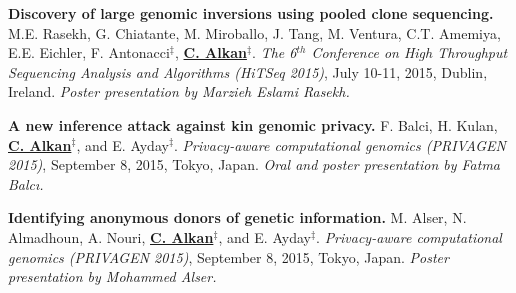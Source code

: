 \vspace{-.2cm}
{\bf Discovery of large genomic inversions using pooled clone sequencing.}
M.E. Rasekh, G. Chiatante, M. Miroballo, J. Tang, M. Ventura, C.T. Amemiya, E.E. Eichler, F. Antonacci$^\ddag$, {\bf {\underline{C. Alkan}}}$^\ddag$.
{\em The 6$^{th}$ Conference on High Throughput Sequencing Analysis and Algorithms (HiTSeq 2015)}, 
July 10-11, 2015, Dublin, Ireland. {\it Poster presentation by Marzieh Eslami Rasekh.}

\vspace{-.2cm}
{\bf  A new inference attack against kin genomic privacy.}
F. Balci, H. Kulan, {\bf {\underline{C. Alkan}}}$^\ddag$, and E. Ayday$^\ddag$. 
{\em Privacy-aware computational genomics (PRIVAGEN 2015)}, 
 September 8, 2015, Tokyo, Japan. {\it Oral and poster presentation by Fatma Balcı.}

\vspace{-.2cm}
{\bf Identifying anonymous donors of genetic information.}
M. Alser, N. Almadhoun, A. Nouri, {\bf {\underline{C. Alkan}}}$^\ddag$, and E. Ayday$^\ddag$. 
{\em Privacy-aware computational genomics (PRIVAGEN 2015)}, 
 September 8, 2015, Tokyo, Japan. {\it Poster presentation by Mohammed Alser.}


\vspace*{-.4cm}

